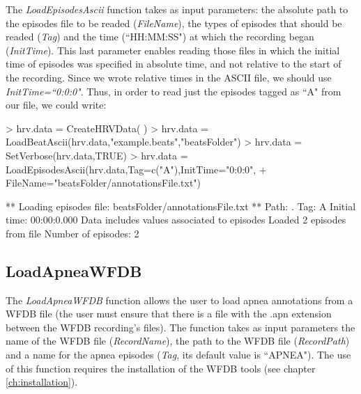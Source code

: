 \documentclass[12pt,lot, lof]{puthesis}
\begin{document}
The \textit{LoadEpisodesAscii} function takes as input parameters: the absolute 
path to the episodes file to be readed (\textit{FileName}), the types of 
episodes that should be readed (\textit{Tag}) and the time (``HH:MM:SS") at 
which the recording began (\textit{InitTime}). This last parameter enables 
reading those files in which the initial time of episodes was specified in 
absolute time, and not relative to the start of the recording. Since we wrote 
relative times in the ASCII file, we should use \textit{InitTime=``0:0:0"}. 
Thus, in order to read just the episodes tagged as ``A" from our file, we could 
write:


\begin{Schunk}
\begin{Sinput}
> hrv.data = CreateHRVData( )
> hrv.data = LoadBeatAscii(hrv.data,"example.beats","beatsFolder")
> hrv.data = SetVerbose(hrv.data,TRUE)
> hrv.data = LoadEpisodesAscii(hrv.data,Tag=c("A"),InitTime="0:0:0",
+ FileName="beatsFolder/annotationsFile.txt")
\end{Sinput}
\begin{Soutput}
** Loading episodes file: beatsFolder/annotationsFile.txt **
   Path: . 
   Tag: A 
   Initial time: 00:00:0.000
   Data includes values associated to episodes
   Loaded 2 episodes from file
   Number of episodes: 2 
\end{Soutput}
\end{Schunk}
\subsection{LoadApneaWFDB} The \textit{LoadApneaWFDB} function allows the user 
to load apnea annotations from a WFDB file (the user must ensure that there is 
a file with the .apn extension between the WFDB recording's files). The 
function takes as input parameters the name of the WFDB file 
(\textit{RecordName}), the path to the WFDB file (\textit{RecordPath}) and a 
name for the apnea episodes (\textit{Tag}, its default value is ``APNEA"). The 
use of this function requires the installation of the WFDB tools (see chapter 
\ref{ch:installation}).
\end{document}
